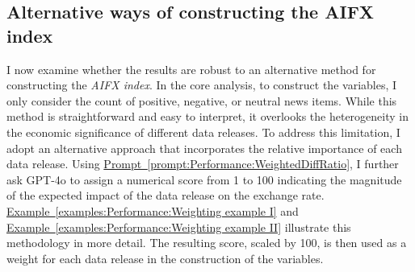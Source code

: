 \documentclass[12pt,oneside,letter]{article}
\newcommand*{\myprp}[1]{\hyperref[{#1}]{Prompt~\ref*{#1}}}
\newcommand*{\myexmpl}[1]{\hyperref[{#1}]{Example~\ref*{#1}}}
\begin{document}
		\subsection{Alternative ways of constructing the AIFX index}
		I now examine whether the results are robust to an alternative method for constructing the \textit{AIFX index}. In the core analysis, to construct the variables, I only consider the count of positive, negative, or neutral news items. While this method is straightforward and easy to interpret, it overlooks the heterogeneity in the economic significance of different data releases. To address this limitation, I adopt an alternative approach that incorporates the relative importance of each data release. Using \myprp{prompt:Performance:WeightedDiffRatio}, I further ask GPT-4o to assign a numerical score from 1 to 100 indicating the magnitude of the expected impact of the data release on the exchange rate. \myexmpl{examples:Performance:Weighting example I} and \myexmpl{examples:Performance:Weighting example II} illustrate this methodology in more detail. The resulting score, scaled by 100, is then used as a weight for each data release in the construction of the variables.
		\begin{prompt}[H] 
			\centering
			\caption{}
			\label{prompt:Performance:WeightedDiffRatio}
		\end{prompt} 
		\vspace{-20pt}\begin{examples}[H] 
			\centering
			\caption{}
			\label{examples:Performance:Weighting example I}
		\end{examples}
\end{document}
